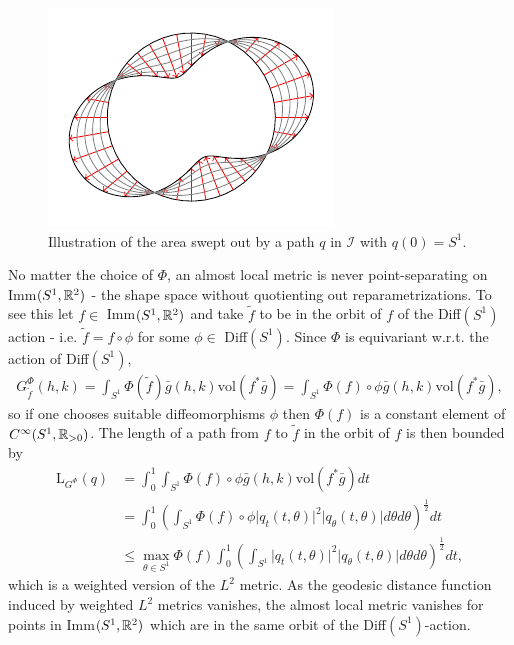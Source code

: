 \begin{figure}[h!]
  \centering
    \includegraphics[scale = 1]{deform_circle.pdf}
  \caption{Illustration of the area swept out by a path $q$ in $\mathcal{I}$ with $q(0) = S^1$.}
  \label{fig:area-swep}
\end{figure}

No matter the choice of $\Phi$, an almost local metric is never point-separating on Imm$(S^1, \mathbb{R}^2)$ - the shape space without quotienting out reparametrizations. To see this let $f \in$ Imm$(S^1, \mathbb{R}^2)$ and take $\tilde{f}$ to be in the orbit of $f$ of the Diff$(S^1)$ action - i.e. $\tilde{f} = f \circ \phi$ for some $\phi \in$ Diff$(S^1)$. Since $\Phi$ is equivariant w.r.t. the action of Diff$(S^1)$,
\begin{align*}
G_{\tilde{f}}^\Phi (h,k) = \int_{S^1} \Phi(\tilde{f}) \bar{g}(h,k) \text{vol}(f^* \bar{g}) = \int_{S^1} \Phi(f) \circ \phi \bar{g}(h,k) \text{vol}(f^* \bar{g}),
\end{align*}
so if one chooses suitable diffeomorphisms $\phi$ then $\Phi(f)$ is a constant element of $C^\infty(S^1, \mathbb{R}_{> 0})$. The length of a path from $f$ to $\tilde{f}$ in the orbit of $f$ is then bounded by
\begin{align*}
\mathrm{L}_{G^\Phi}(q) & = \int_0^1 \int_{S^1} \Phi(f) \circ \phi \bar{g}(h,k) \text{vol}(f^* \bar{g}) dt \\
& = \int_0^1 \left( \int_{S^1} \Phi(f) \circ \phi \vert q_t(t, \theta) \vert ^2 \vert q_\theta(t, \theta) \vert d \theta d \theta \right) ^{\frac{1}{2}} dt \\
& \leq \max_{\theta \in S^1} \Phi(f) \int_0^1 \left( \int_{S^1} \vert q_t(t, \theta) \vert ^2 \vert q_\theta(t, \theta) \vert d \theta d \theta \right) ^{\frac{1}{2}} dt,
\end{align*}
which is a weighted version of the $L^2$ metric. As the geodesic distance function induced by weighted $L^2$ metrics vanishes, the almost local metric vanishes for points in Imm$(S^1, \mathbb{R}^2)$ which are in the same orbit of the Diff$(S^1)$-action.

